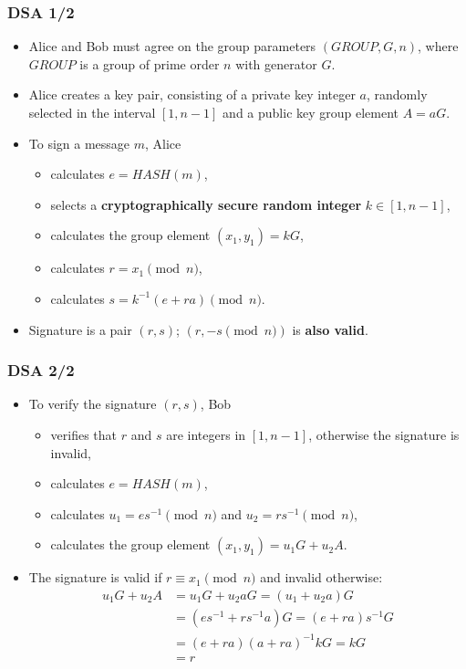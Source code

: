\documentclass{beamer}
\begin{document}
\begin{frame}
  \frametitle{DSA 1/2}
  \begin{itemize}
  \item Alice and Bob must agree on the group parameters $(GROUP, G, n)$, where
    $GROUP$ is a group of prime order $n$ with generator $G$.
  \item Alice creates a key pair, consisting of a private key integer $a$,
    randomly selected in the interval $[1, n - 1]$ and a public key group
    element $A = aG$.
  \item To sign a message $m$, Alice
    \begin{itemize}
    \item calculates $e = HASH(m)$,
    \item selects a \textbf{cryptographically secure random integer}
      $k \in [1, n - 1]$,
    \item calculates the group element $(x_1, y_1) = kG$,
    \item calculates $r = x_1 \pmod{n}$,
    \item calculates $s = k^{-1}(e + ra) \pmod{n}$.
    \end{itemize}
  \item Signature is a pair $(r, s)$; $(r, -s \pmod{n})$ is \textbf{also valid}.
  \end{itemize}
\end{frame}

\begin{frame}
  \frametitle{DSA 2/2}
  \begin{itemize}
  \item To verify the signature $(r, s)$, Bob
    \begin{itemize}
    \item verifies that $r$ and $s$ are integers in $[1, n - 1]$, otherwise the
      signature is invalid,
    \item calculates $e = HASH(m)$,
    \item calculates $u_1 = es^{-1} \pmod{n}$ and $u_2 = rs^{-1} \pmod{n}$,
    \item calculates the group element $(x_1, y_1) = u_1G + u_2A$.
    \end{itemize}
  \item The signature is valid if $r \equiv x_1 \pmod{n}$ and invalid otherwise:
    \begin{align*}
      u_1G + u_2A &= u_1G + u_2aG = (u_1 + u_2a)G \\
                  &= (es^{-1} + rs^{-1}a)G = (e + ra)s^{-1}G \\
                  &= (e + ra)(a + ra)^{-1}kG = kG \\
                  &= r
    \end{align*}
  \end{itemize}
\end{frame}
\end{document}
